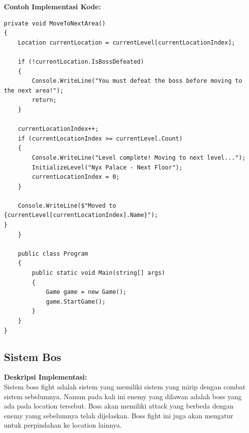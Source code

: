 \documentclass[12pt]{article}
\begin{document}
\textbf{Contoh Implementasi Kode:}
\begin{lstlisting}[language=CSharp, caption=Implementasi Area Movement System]
private void MoveToNextArea()
{
    Location currentLocation = currentLevel[currentLocationIndex];
    
    if (!currentLocation.IsBossDefeated)
    {
        Console.WriteLine("You must defeat the boss before moving to the next area!");
        return;
    }

    currentLocationIndex++;
    if (currentLocationIndex >= currentLevel.Count)
    {
        Console.WriteLine("Level complete! Moving to next level...");
        InitializeLevel("Nyx Palace - Next Floor");
        currentLocationIndex = 0;
    }

    Console.WriteLine($"Moved to {currentLevel[currentLocationIndex].Name}");
}
    }

    public class Program
    {
        public static void Main(string[] args)
        {
            Game game = new Game();
            game.StartGame();
        }
    }
}
\end{lstlisting}

\subsection{Sistem Bos}
\textbf{Deskripsi Implementasi:} \\
Sistem boss fight adalah sistem yang memiliki sistem yang mirip dengan combat sistem sebelumnya. Namun pada kali ini enemy yang dilawan adalah boss yang ada pada location tersebut. Boss akan memiliki attack yang berbeda dengan enemy yamg sebelumnya telah dijelaskan. Boss fight ini juga akan mengatur untuk perpindahan ke location lainnya.
\end{document}
